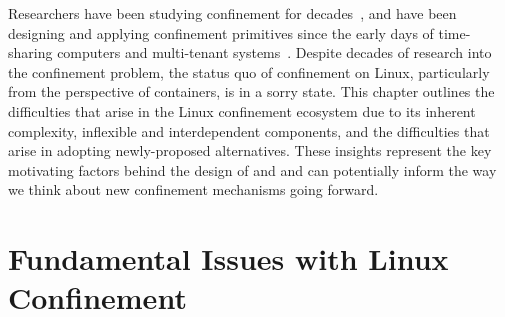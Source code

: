Researchers have been studying confinement for decades~\cite{lampson1973_confinement}, and
have been designing and applying confinement primitives since the early days of
time-sharing computers and multi-tenant systems~\cite{shu2016_security_isolation_study}.
Despite decades of research into the confinement problem, the status quo of confinement on
Linux, particularly from the perspective of containers, is in a sorry state. This chapter
outlines the difficulties that arise in the Linux confinement ecosystem due to its
inherent complexity, inflexible and interdependent components, and the difficulties that
arise in adopting newly-proposed alternatives. These insights represent the key
motivating factors behind the design of \bpfbox{} and \bpfcontain{} and can potentially
inform the way we think about new confinement mechanisms going forward.

\section{Fundamental Issues with Linux Confinement}%
\label{s:cp-confinement-issues}

